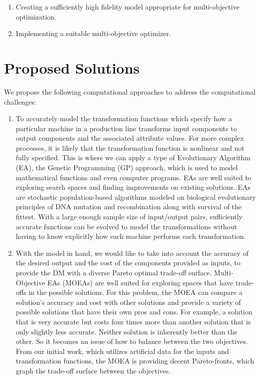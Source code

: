 \documentclass{IEEEtran}
\begin{document}
\begin{enumerate}
\item Creating a sufficiently high fidelity model appropriate for multi-objective optimization.
\item Implementing a suitable multi-objective optimizer.
\end{enumerate}

\section{Proposed Solutions}
We propose the following computational approaches to address the computational challenges:

\begin{enumerate}
\item To accurately model the transformation functions which specify how a particular machine in a production line transforms input components to output components and the associated attribute values. For more complex processes, it is likely that the transformation function is nonlinear and not fully specified. This is where we can apply a type of Evolutionary Algorithm (EA), the Genetic Programming (GP) approach, which is used to model mathematical functions and even computer programs. EAs are well suited to exploring search spaces and finding improvements on existing solutions. EAs are stochastic population-based algorithms modeled on biological evolutionary principles of DNA mutation and recombination along with survival of the fittest. With a large enough sample size of input/output pairs, sufficiently accurate functions can be evolved to model the transformations without having to know explicitly how each machine performs each transformation.
\item With the model in hand, we would like to take into account the accuracy of the desired output and the cost of the components provided as inputs, to provide the DM with a diverse Pareto optimal trade-off surface. Multi-Objective EAs (MOEAs) are well suited for exploring spaces that have trade-offs in the possible solutions. For this problem, the MOEA can compare a solution’s accuracy and cost with other solutions and provide a variety of possible solutions that have their own pros and cons. For example, a solution that is very accurate but costs four times more than another solution that is only slightly less accurate. Neither solution is inherently better than the other. So it becomes an issue of how to balance between the two objectives. From our initial work, which utilizes artificial data for the inputs and transformation functions, the MOEA is providing decent Pareto-fronts, which graph the trade-off surface between the objectives.
\end{enumerate}
\end{document}
